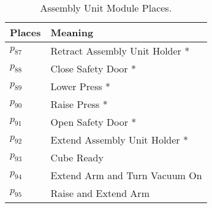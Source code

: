\begin{table}[H]
\caption{Assembly Unit Module Places.}
\centering
\begin{tabular}{M{5cm}M{10cm}}
Places & Meaning\\
\hline
\hyperlink{partialNet:p871}{\hypertarget{partialTable:p87}{$p_{87}$}} & Retract Assembly Unit Holder *\\
\hyperlink{partialNet:p881}{\hypertarget{partialTable:p88}{$p_{88}$}} & Close Safety Door *\\
\hyperlink{partialNet:p891}{\hypertarget{partialTable:p89}{$p_{89}$}} & Lower Press *\\
\hyperlink{partialNet:p901}{\hypertarget{partialTable:p90}{$p_{90}$}} & Raise Press *\\
\hyperlink{partialNet:p911}{\hypertarget{partialTable:p91}{$p_{91}$}} & Open Safety Door *\\
\hyperlink{partialNet:p921}{\hypertarget{partialTable:p92}{$p_{92}$}} & Extend Assembly Unit Holder *\\
\hyperlink{partialNet:p931}{\hypertarget{partialTable:p93}{$p_{93}$}} & Cube Ready\\
\hyperlink{partialNet:p941}{\hypertarget{partialTable:p94}{$p_{94}$}} & Extend Arm and Turn Vacuum On\\
\hyperlink{partialNet:p951}{\hypertarget{partialTable:p95}{$p_{95}$}} & Raise and Extend Arm\\
\end{tabular}
\end{table}
